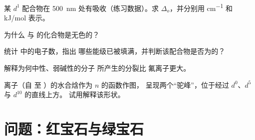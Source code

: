 \begin{exercise}[$\star\star$]\label{exo:b2:ligand-field:8}
某 $d^1$ 配合物在 \qty{500}{nm} 处有吸收（练习数据）。求 $\Delta_o$，并分别用 \unit{cm^{-1}}
和 \unit{kJ/mol} 表示。
\end{exercise}

\begin{exercise}[$\star\star$]\label{exo:b2:ligand-field:9}
为什么  与  的化合物是无色的？
\end{exercise}

\begin{exercise}[$\star\star\star$]\label{exo:b2:ligand-field:10}
统计  中的电子数，指出
哪些能级已被填满，并判断该配合物是否为的？
\end{exercise}

\begin{exercise}[$\star\star\star$]\label{exo:b2:ligand-field:11}
解释为何中性、弱碱性的分子  所产生的分裂比
氟离子更大。
\end{exercise}

\begin{exercise}[$\star\star\star$]\label{exo:b2:ligand-field:12}
 离子（自  至 ）的水合焓作为 $n$ 的函数作图，
呈现两个“驼峰”，位于经过 $d^0$、$d^5$ 与 $d^{10}$ 的直线上方。
试用解释该形状。
\end{exercise}

\section{问题：红宝石与绿宝石}

